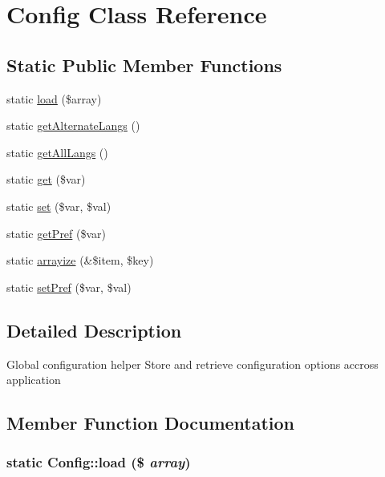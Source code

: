 \hypertarget{classConfig}{
\section{Config Class Reference}
\label{classConfig}
}
\subsection*{Static Public Member Functions}
\begin{CompactItemize}
\item 
static \hyperlink{classConfig_df356f9d88c4d008065d55ed47a3fae3}{load} (\$array)
\item 
static \hyperlink{classConfig_a149b732a598127118181e5b5404f0b4}{getAlternateLangs} ()
\item 
static \hyperlink{classConfig_5ee304b559ffded8d924349debf8708b}{getAllLangs} ()
\item 
static \hyperlink{classConfig_c611a0172a86bc5f4305bee2a041dd85}{get} (\$var)
\item 
static \hyperlink{classConfig_efc9b653ba1b3353dd782cdf0ecb4983}{set} (\$var, \$val)
\item 
static \hyperlink{classConfig_232f5008f38ed5f98853244095b935af}{getPref} (\$var)
\item 
static \hyperlink{classConfig_c3a31a273309242bd21578c108ad550c}{arrayize} (\&\$item, \$key)
\item 
static \hyperlink{classConfig_65cd0982a67c8f58c0fe788d65862ac7}{setPref} (\$var, \$val)
\end{CompactItemize}


\subsection{Detailed Description}
Global configuration helper Store and retrieve configuration options accross application 

\subsection{Member Function Documentation}
\hypertarget{classConfig_df356f9d88c4d008065d55ed47a3fae3}{
\subsubsection[load]{\setlength{\rightskip}{0pt plus 5cm}static Config::load (\$ {\em array})}}
\label{classConfig_df356f9d88c4d008065d55ed47a3fae3}


